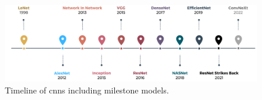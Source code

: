 \begin{figure}[h]
    \centering
    \includegraphics[width=\textwidth]{fig/rel/images/CNN_timeline.pdf}
    \caption{Timeline of \glspl{cnn} including milestone models.}
    \label{fig:cnn_timeline}
\end{figure}